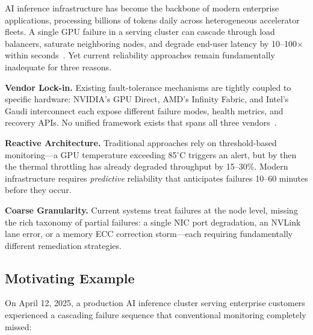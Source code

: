 \documentclass[conference,10pt,letterpaper]{IEEEtran}
\begin{document}
AI inference infrastructure has become the backbone of modern enterprise applications, processing billions of tokens daily across heterogeneous accelerator fleets. A single GPU failure in a serving cluster can cascade through load balancers, saturate neighboring nodes, and degrade end-user latency by 10--100$\times$ within seconds~\cite{kwon2023vllm}. Yet current reliability approaches remain fundamentally inadequate for three reasons.

\textbf{Vendor Lock-in.} Existing fault-tolerance mechanisms are tightly coupled to specific hardware: NVIDIA's GPU Direct, AMD's Infinity Fabric, and Intel's Gaudi interconnect each expose different failure modes, health metrics, and recovery APIs. No unified framework exists that spans all three vendors~\cite{amd2024mi300x,intel2024gaudi3}.

\textbf{Reactive Architecture.} Traditional approaches rely on threshold-based monitoring---a GPU temperature exceeding 85$^\circ$C triggers an alert, but by then the thermal throttling has already degraded throughput by 15--30\%. Modern infrastructure requires \emph{predictive} reliability that anticipates failures 10--60 minutes before they occur.

\textbf{Coarse Granularity.} Current systems treat failures at the node level, missing the rich taxonomy of partial failures: a single NIC port degradation, an NVLink lane error, or a memory ECC correction storm---each requiring fundamentally different remediation strategies.


\subsection{Motivating Example}

On April 12, 2025, a production AI inference cluster serving enterprise customers experienced a cascading failure sequence that conventional monitoring completely missed:
\end{document}
